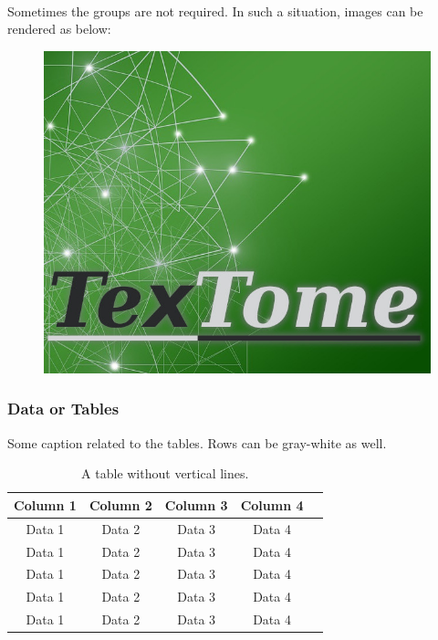 \lipsum[3-4] \\
\newpage

Sometimes the groups are not required. In such a situation, images can be rendered as below:

\begin{figure}[H]
\centering
\begin{minipage}{1\textwidth}
  \centering
  \includegraphics[width=\textwidth]{Figures/general/dummy_sq.jpg}
  \label{fig:soloImg}
\end{minipage}
\hfill
\end{figure}

\subsubsection{Data or Tables}
\label{subsec:method_secureAuth}
Some caption related to the tables. Rows can be gray-white as well. \\


\begin{table}[ht]
\centering
\caption{A table without vertical lines.}
\begin{tabular}[t]{ccccc}
\toprule
\color{Soft-Blue}\textbf{Column 1}&\color{Soft-Blue}\textbf{Column 2}&\color{Soft-Blue}\textbf{Column 3}&\color{Soft-Blue}\textbf{Column 4}\\
\midrule
Data 1 & Data 2 & Data 3 & Data 4\\
Data 1 & Data 2 & Data 3 & Data 4\\
Data 1 & Data 2 & Data 3 & Data 4\\
Data 1 & Data 2 & Data 3 & Data 4\\
Data 1 & Data 2 & Data 3 & Data 4\\
\bottomrule
\end{tabular}
\label{tab:tabCaption}
\end{table}

